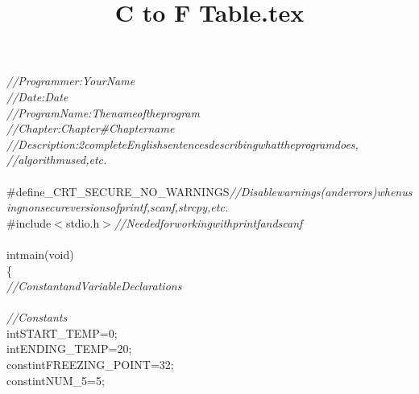 \documentclass[a4paper, 10pt]{article}
\title{C to F Table.tex}
\newcommand\SPC{\hspace*{0.6em}}
\newcommand\TAB{\hspace*{1.2em}}
\newcommand\HYP{\mbox{\char 45}}
\newcommand{\CppAComment}[1]{\textit{\textcolor[rgb]{0.4,0.45,0.48}{#1}}}
\newcommand{\CppAIdentifier}[1]{\textcolor[rgb]{0.88,0.89,0.89}{#1}}
\newcommand{\CppANumber}[1]{\textcolor[rgb]{1,0.8,0.13}{#1}}
\newcommand{\CppAPreprocessor}[1]{\textcolor[rgb]{0.63,0.51,0.74}{#1}}
\newcommand{\CppAReservedWord}[1]{\textcolor[rgb]{0.4,0.55,0.69}{#1}}
\newcommand{\CppASpace}[1]{\colorbox[rgb]{0.16,0.19,0.2}{#1}}
\newcommand{\CppASymbol}[1]{\textcolor[rgb]{0.91,0.89,0.72}{#1}}
\begin{document}
\begin{ttfamily}
\noindent
\CppAComment{//\SPC Programmer:\TAB \TAB Your\SPC Name}\\
\CppAComment{//\SPC Date:\TAB \TAB \TAB Date}\\
\CppAComment{//\SPC Program\SPC Name:\TAB The\SPC name\SPC of\SPC the\SPC program}\\
\CppAComment{//\SPC Chapter:\TAB \TAB \TAB Chapter\SPC \#\SPC \HYP \SPC Chapter\SPC name}\\
\CppAComment{//\SPC Description:\TAB \TAB 2\SPC complete\SPC English\SPC sentences\SPC describing\SPC what\SPC the\SPC program\SPC does,}\\
\CppAComment{//\TAB \TAB \TAB \TAB \TAB algorithm\SPC used,\SPC etc.}\\
\\
\CppAPreprocessor{\#define\SPC \_CRT\_SECURE\_NO\_WARNINGS\SPC }\CppAComment{//\SPC Disable\SPC warnings\SPC (and\SPC errors)\SPC when\SPC using\SPC non\HYP secure\SPC versions\SPC of\SPC printf,\SPC scanf,\SPC strcpy,\SPC etc.}\\
\CppAPreprocessor{\#include\SPC $<$stdio.h$>$\SPC }\CppAComment{//\SPC Needed\SPC for\SPC working\SPC with\SPC printf\SPC and\SPC scanf}\\
\\
\CppAReservedWord{int}\CppASpace{\SPC }\CppAIdentifier{main}\CppASymbol{(}\CppAReservedWord{void}\CppASymbol{)}\\
\CppASymbol{\{}\\
\CppASpace{\TAB }\CppAComment{//\SPC Constant\SPC and\SPC Variable\SPC Declarations}\\
\\
\CppASpace{\TAB }\CppAComment{//\SPC Constants}\\
\CppASpace{\TAB }\CppAReservedWord{int}\CppASpace{\SPC }\CppAIdentifier{START\_TEMP}\CppASpace{\SPC }\CppASymbol{=}\CppASpace{\SPC }\CppANumber{0}\CppASymbol{;}\\
\CppASpace{\TAB }\CppAReservedWord{int}\CppASpace{\SPC }\CppAIdentifier{ENDING\_TEMP}\CppASpace{\SPC }\CppASymbol{=}\CppASpace{\SPC }\CppANumber{20}\CppASymbol{;}\\
\CppASpace{\TAB }\CppAReservedWord{const}\CppASpace{\SPC }\CppAReservedWord{int}\CppASpace{\SPC }\CppAIdentifier{FREEZING\_POINT}\CppASpace{\SPC }\CppASymbol{=}\CppASpace{\SPC }\CppANumber{32}\CppASymbol{;}\\
\CppASpace{\TAB }\CppAReservedWord{const}\CppASpace{\SPC }\CppAReservedWord{int}\CppASpace{\SPC }\CppAIdentifier{NUM\_5}\CppASpace{\SPC }\CppASymbol{=}\CppASpace{\SPC }\CppANumber{5}\CppASymbol{;}\\

\end{ttfamily}
\end{document}

